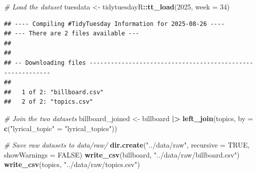 \documentclass[
]{article}
\newenvironment{Shaded}{\begin{snugshade}}{\end{snugshade}}
\newcommand{\AttributeTok}[1]{\textcolor[rgb]{0.13,0.29,0.53}{#1}}
\newcommand{\CommentTok}[1]{\textcolor[rgb]{0.56,0.35,0.01}{\textit{#1}}}
\newcommand{\ConstantTok}[1]{\textcolor[rgb]{0.56,0.35,0.01}{#1}}
\newcommand{\DecValTok}[1]{\textcolor[rgb]{0.00,0.00,0.81}{#1}}
\newcommand{\FunctionTok}[1]{\textcolor[rgb]{0.13,0.29,0.53}{\textbf{#1}}}
\newcommand{\NormalTok}[1]{#1}
\newcommand{\OtherTok}[1]{\textcolor[rgb]{0.56,0.35,0.01}{#1}}
\newcommand{\SpecialCharTok}[1]{\textcolor[rgb]{0.81,0.36,0.00}{\textbf{#1}}}
\newcommand{\StringTok}[1]{\textcolor[rgb]{0.31,0.60,0.02}{#1}}
\begin{document}
\begin{Shaded}
\begin{Highlighting}[]
\CommentTok{\# Load the dataset}
\NormalTok{tuesdata }\OtherTok{\textless{}{-}}\NormalTok{ tidytuesdayR}\SpecialCharTok{::}\FunctionTok{tt\_load}\NormalTok{(}\DecValTok{2025}\NormalTok{, }\AttributeTok{week =} \DecValTok{34}\NormalTok{)}
\end{Highlighting}
\end{Shaded}

\begin{verbatim}
## ---- Compiling #TidyTuesday Information for 2025-08-26 ----
## --- There are 2 files available ---
## 
## 
## -- Downloading files -----------------------------------------------------------
## 
##   1 of 2: "billboard.csv"
##   2 of 2: "topics.csv"
\end{verbatim}

\begin{Shaded}
\end{Shaded}

\begin{Shaded}
\begin{Highlighting}[]
\CommentTok{\# Join the two datasets}
\NormalTok{billboard\_joined }\OtherTok{\textless{}{-}}\NormalTok{ billboard }\SpecialCharTok{|\textgreater{}}
  \FunctionTok{left\_join}\NormalTok{(topics, }\AttributeTok{by =} \FunctionTok{c}\NormalTok{(}\StringTok{"lyrical\_topic"} \OtherTok{=} \StringTok{"lyrical\_topics"}\NormalTok{))}
\end{Highlighting}
\end{Shaded}

\begin{Shaded}
\begin{Highlighting}[]
\CommentTok{\# Save raw datasets to data/raw/}
\FunctionTok{dir.create}\NormalTok{(}\StringTok{"../data/raw"}\NormalTok{, }\AttributeTok{recursive =} \ConstantTok{TRUE}\NormalTok{, }\AttributeTok{showWarnings =} \ConstantTok{FALSE}\NormalTok{)}
\FunctionTok{write\_csv}\NormalTok{(billboard, }\StringTok{"../data/raw/billboard.csv"}\NormalTok{)}
\FunctionTok{write\_csv}\NormalTok{(topics, }\StringTok{"../data/raw/topics.csv"}\NormalTok{)}
\end{Highlighting}
\end{Shaded}
\end{document}
